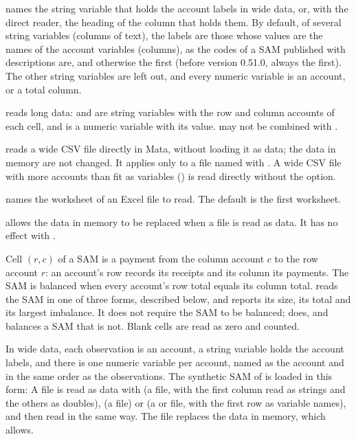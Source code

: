 \begin{optdesc}
\item[\optarg{lab}{els}{varname}] names the string variable that holds the
account labels in wide data, or, with the direct reader, the heading of the
column that holds them. By default, of several string variables (columns of
text), the labels are those whose values are the names of the account
variables (columns), as the codes of a SAM published with descriptions are,
and otherwise the first (before version 0.51.0, always the first). The other
string variables are left out, and every numeric variable is an account, or
a total column.

\item[\optarg{}{long}{rowvar colvar valuevar}] reads long data: 
and  are string variables with the row and column accounts of each
cell, and  is a numeric variable with its value. 
may not be combined with .

\item[\opt{}{direct}] reads a wide CSV file directly in Mata, without loading
it as data; the data in memory are not changed. It applies only to a
 file named with . A wide CSV file with more accounts
than fit as variables () is read directly without the option.

\item[\optarg{}{sheet}{string}] names the worksheet of an Excel file to read.
The default is the first worksheet.

\item[\opt{}{clear}] allows the data in memory to be replaced when a file is
read as data. It has no effect with .
\end{optdesc}


Cell $(r, c)$ of a SAM is a payment from the column account $c$ to the row
account $r$: an account's row records its receipts and its column its
payments. The SAM is balanced when every account's row total equals its column
total.  reads the SAM in one of three forms, described below, and
reports its size, its total and its largest imbalance. It does not require the
SAM to be balanced;  does, and  balances a
SAM that is not. Blank cells are read as zero and counted.


In wide data, each observation is an account, a string variable holds the
account labels, and there is one numeric variable per account, named as the
account and in the same order as the observations. The synthetic SAM of
 is loaded in this form:
A file is read as data with  (a  file, with
the first column read as strings and the others as doubles),  (a
 file) or  (a  or  file, with
the first row as variable names), and then read in the same way. The file
replaces the data in memory, which  allows.

